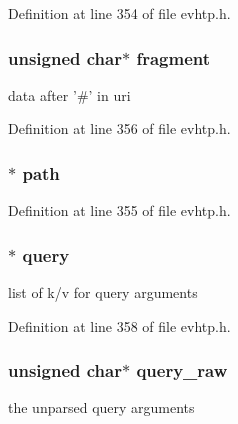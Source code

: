 \-Definition at line 354 of file evhtp.\-h.

\hypertarget{structevhtp__uri__s_a3c28c1d14341a7ab7ceb5600b7d353ae}{
\subsubsection[{fragment}]{\setlength{\rightskip}{0pt plus 5cm}unsigned char$\ast$ {\bf fragment}}}\label{structevhtp__uri__s_a3c28c1d14341a7ab7ceb5600b7d353ae}
data after '\#' in uri 

\-Definition at line 356 of file evhtp.\-h.

\hypertarget{structevhtp__uri__s_af5dec3b872833197fa6e19e681e8a50b}{
\subsubsection[{path}]{$\ast$ {\bf path}}}\label{structevhtp__uri__s_af5dec3b872833197fa6e19e681e8a50b}


\-Definition at line 355 of file evhtp.\-h.

\hypertarget{structevhtp__uri__s_ade25f426b13f051ad7fe2feacbcdf44e}{
\subsubsection[{query}]{$\ast$ {\bf query}}}\label{structevhtp__uri__s_ade25f426b13f051ad7fe2feacbcdf44e}
list of k/v for query arguments 

\-Definition at line 358 of file evhtp.\-h.

\hypertarget{structevhtp__uri__s_ab78fb0297ee5380de7fe7087c2dada1b}{
\subsubsection[{query\-\_\-raw}]{\setlength{\rightskip}{0pt plus 5cm}unsigned char$\ast$ {\bf query\-\_\-raw}}}\label{structevhtp__uri__s_ab78fb0297ee5380de7fe7087c2dada1b}
the unparsed query arguments 

